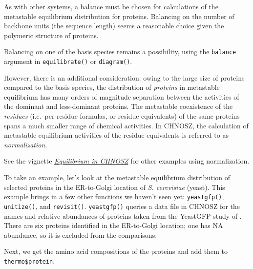 \documentclass[]{tufte-book}
\newenvironment{Shaded}{}{}
\newcommand{\KeywordTok}[1]{\textcolor[rgb]{0.00,0.44,0.13}{\textbf{#1}}}
\newcommand{\StringTok}[1]{\textcolor[rgb]{0.25,0.44,0.63}{#1}}
\newcommand{\OperatorTok}[1]{\textcolor[rgb]{0.40,0.40,0.40}{#1}}
\newcommand{\NormalTok}[1]{#1}
\begin{document}
As with other systems, a balance must be chosen for calculations of the
metastable equilibrium distribution for proteins. Balancing on the
number of backbone units (the sequence length) seems a reasonable choice
given the polymeric structure of proteins.

\begin{marginfigure}
Balancing on one of the basis species remains a possibility, using the
\texttt{balance} argument in {\texttt{equilibrate()}} or
{\texttt{diagram()}}.
\end{marginfigure}

However, there is an additional consideration: owing to the large size
of proteins compared to the basis species, the distribution of
\emph{proteins} in metastable equilibrium has many orders of magnitude
separation between the activities of the dominant and less-dominant
proteins. The metastable coexistence of the \emph{residues}
(i.e.~per-residue formulas, or residue equivalents) of the same proteins
spans a much smaller range of chemical activities. In CHNOSZ, the
calculation of metastable equilibrium activities of the residue
equivalents is referred to as \emph{normalization}.

\begin{marginfigure}
See the vignette \href{equilibrium.pdf}{{\emph{Equilibrium in CHNOSZ}}}
for other examples using normalization.
\end{marginfigure}

To take an example, let's look at the metastable equilibrium
distribution of selected proteins in the ER-to-Golgi location of
\emph{S. cerevisiae} (yeast). This example brings in a few other
functions we haven't seen yet: {\texttt{yeastgfp()}},
{\texttt{unitize()}}, and {\texttt{revisit()}}. {\texttt{yeastgfp()}}
queries a data file in CHNOSZ for the names and relative abundances of
proteins taken from the YeastGFP study of \citet{GHB_03}. There are six
proteins identified in the ER-to-Golgi location; one has NA abundance,
so it is excluded from the comparisons:

\begin{Shaded}
\end{Shaded}

Next, we get the amino acid compositions of the proteins and add them to
\texttt{thermo\$protein}:
\end{document}
